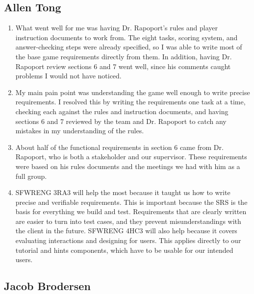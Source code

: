 \documentclass[12pt]{article}
\begin{document}
\subsection*{Allen Tong}

\begin{enumerate}
  \item What went well for me was having Dr. Rapoport's rules and player instruction documents to work from. The eight tasks, scoring system, and answer-checking steps were already specified, so I was able to write most of the base game requirements directly from them. In addition, having Dr. Rapoport review sections 6 and 7 went well, since his comments caught problems I would not have noticed.
  \item My main pain point was understanding the game well enough to write precise requirements. I resolved this by writing the requirements one task at a time, checking each against the rules and instruction documents, and having sections 6 and 7 reviewed by the team and Dr. Rapoport to catch any mistakes in my understanding of the rules.
  \item About half of the functional requirements in section 6 came from Dr. Rapoport, who is both a stakeholder and our supervisor. These requirements were based on his rules documents and the meetings we had with him as a full group.
  \item SFWRENG 3RA3 will help the most because it taught us how to write precise and verifiable requirements. This is important because the SRS is the basis for everything we build and test. Requirements that are clearly written are easier to turn into test cases, and they prevent misunderstandings with the client in the future. SFWRENG 4HC3 will also help because it covers evaluating interactions and designing for users. This applies directly to our tutorial and hints components, which have to be usable for our intended users.
\end{enumerate}

\subsection*{Jacob Brodersen}
\end{document}
